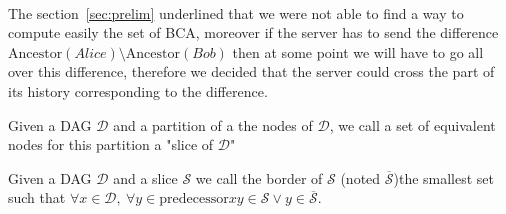 \paragraph{} The section~\ref{sec:prelim} underlined that we were not able to find a way to compute easily the set of BCA, moreover if the server has to send the difference $\mathrm{Ancestor}(Alice) \setminus \mathrm{Ancestor}(Bob)$ then at some point we will have to go all over this difference, therefore we decided that the server could cross the part of its history corresponding to the difference.
\begin{definition}
 Given a DAG $\mathcal{D}$ and a partition of a the nodes of $\mathcal{D}$, we call a set of equivalent nodes for this partition a "slice of $\mathcal{D}$"
\end{definition}
\begin{definition}
 Given a DAG $\mathcal{D}$ and a slice $\mathcal{S}$ we call the border of $\mathcal{S}$ (noted $\overline{\mathcal S}$)the smallest set such that $\forall x \in \mathcal{D},\ \forall y\in \mathrm{predecessor}{x} y\in \mathcal{S} \vee y \in \overline{\mathcal S}$.
\end{definition}
